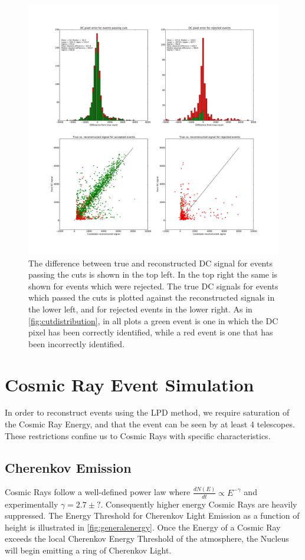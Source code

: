 \documentclass{article}
\begin{document}
\begin{figure}
\begin{center}
\includegraphics[width=\textwidth]{DCcounterror}
\caption{The difference between true and reconstructed DC signal for events passing the cuts is shown in the top left. In the top right the same is shown for events which were rejected. The true DC signals for events which passed the cuts is plotted against the reconstructed signals in the lower left, and for rejected events in the lower right. As in \ref{fig:cutdistribution}, in all plots a green event is one in which the DC pixel has been correctly identified, while a red event is one that has been incorrectly identified.}
\label{fig:dcdiff}
\end{center}
\end{figure}

\section{Cosmic Ray Event Simulation}
In order to reconstruct events using the LPD method, we require saturation of the Cosmic Ray Energy, and that the event can be seen by at least 4 telescopes. These restrictions confine us to Cosmic Rays with specific characteristics.

\subsection{Cherenkov Emission}
Cosmic Rays follow a well-defined power law where $ \frac{dN(E)}{dt} \propto E^{-\gamma} $ and experimentally $ \gamma = 2.7 \pm ? $. Consequently higher energy Cosmic Rays are heavily suppressed. The Energy Threshold for Cherenkov Light Emission as a function of height is illustrated in \ref{fig:generalenergy}. Once the Energy of a Cosmic Ray exceeds the local Cherenkov Energy Threshold of the atmosphere, the Nucleus will begin emitting a ring of Cherenkov Light. 
\end{document}
